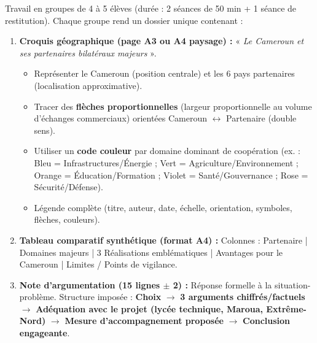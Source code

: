 \documentclass[11pt]{article}
\newcounter{popsec}
\newcounter{popsub}
\newcommand{\courssub}[1]{%
  \stepcounter{popsub}%
  \par\vspace{9pt}\noindent{\popxbold\fontsize{11.5}{13}\selectfont\color{popink}{\color{poporange}\thepopsec.\thepopsub}\hspace{6pt}#1}\par\nopagebreak\vspace{4pt}
}
\begin{document}
\courssub{Consignes}
\noindent Travail en groupes de 4 à 5 élèves (durée : 2 séances de 50 min + 1 séance de restitution). Chaque groupe rend un dossier unique contenant :
\begin{enumerate}
    \item \textbf{Croquis géographique (page A3 ou A4 paysage) :} « \textit{Le Cameroun et ses partenaires bilatéraux majeurs} ».
        \begin{itemize}
            \item Représenter le Cameroun (position centrale) et les 6 pays partenaires (localisation approximative).
            \item Tracer des \textbf{flèches proportionnelles} (largeur proportionnelle au volume d'échanges commerciaux) orientées Cameroun $\leftrightarrow$ Partenaire (double sens).
            \item Utiliser un \textbf{code couleur} par domaine dominant de coopération (ex. : \textcolor{popblue}{Bleu} = Infrastructures/Énergie ; \textcolor{popgreen}{Vert} = Agriculture/Environnement ; \textcolor{poporange}{Orange} = Éducation/Formation ; \textcolor{poppurple}{Violet} = Santé/Gouvernance ; \textcolor{poppink}{Rose} = Sécurité/Défense).
            \item Légende complète (titre, auteur, date, échelle, orientation, symboles, flèches, couleurs).
        \end{itemize}
    \item \textbf{Tableau comparatif synthétique (format A4) :} Colonnes : Partenaire | Domaines majeurs | 3 Réalisations emblématiques | Avantages pour le Cameroun | Limites / Points de vigilance.
    \item \textbf{Note d'argumentation (15 lignes $\pm$ 2) :} Réponse formelle à la situation-problème. Structure imposée : \textbf{Choix} $\rightarrow$ \textbf{3 arguments chiffrés/factuels} $\rightarrow$ \textbf{Adéquation avec le projet (lycée technique, Maroua, Extrême-Nord)} $\rightarrow$ \textbf{Mesure d'accompagnement proposée} $\rightarrow$ \textbf{Conclusion engageante}.
\end{enumerate}
\end{document}
